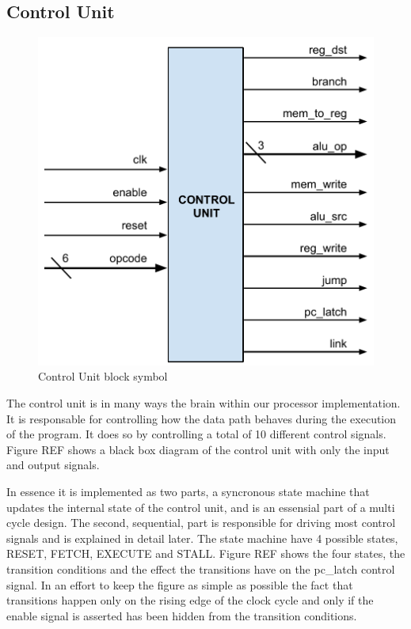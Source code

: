 \subsection*{Control Unit}

\begin{figure}[h]
    \centering\includegraphics[scale=0.5]{figures/control_unit_block_symbol}
    \caption{Control Unit block symbol}
\end{figure}
The control unit is in many ways the brain within our processor implementation. It is responsable for controlling how the data path behaves during the execution of the program. It does so by controlling a total of 10 different control signals. Figure REF shows a black box diagram of the control unit with only the input and output signals.

In essence it is implemented as two parts, a syncronous state machine that updates the internal state of the control unit, and is an essensial part of a multi cycle design. The second, sequential, part is responsible for driving most control signals and is explained in detail later. The state machine have 4 possible states, RESET, FETCH, EXECUTE and STALL. Figure REF shows the four states, the transition conditions and the effect the transitions have on the pc\_latch control signal. In an effort to keep the figure as simple as possible the fact that transitions happen only on the rising edge of the clock cycle and only if the enable signal is asserted has been hidden from the transition conditions.


